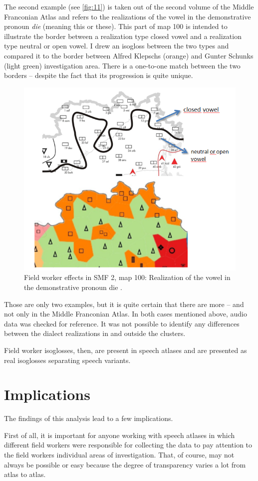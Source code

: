 \documentclass[output=paper]{LSP/langsci}
\begin{document}
The second example (see \ref{fig:11}) is taken out of the second volume of the Middle Franconian Atlas and refers to the realizations of the vowel in the demonstrative pronoun \textit{die} (meaning this or these). This part of map 100 is intended to illustrate the border between a realization type {\textquotedbl}closed vowel{\textquotedbl} and a realization type {\textquotedbl}neutral or open vowel{\textquotedbl}. I drew an isogloss between the two types and compared it to the border between Alfred Klepsch{\textquotesingle}s (orange) and Gunter Schunk{\textquotesingle}s (light green) investigation area. There is a one-to-one match between the two borders – despite the fact that its progression is quite unique.

\begin{figure}
\includegraphics[width=.4\textwidth]{illustrations/mathus_fig12}
\caption{Field worker effects in SMF 2, map 100: Realization of the vowel in the demonstrative pronoun {\textquotedbl}die{\textquotedbl} \citep[241]{mathussek_sprachraume_2014}.}
\label{fig:12}
\end{figure}

Those are only two examples, but it is quite certain that there are more – and not only in the Middle Franconian Atlas. In both cases mentioned above, audio data was checked for reference. It was not possible to identify any differences between the dialect realizations in and outside the clusters.

Field worker isoglosses, then, are present in speech atlases and are presented as {\textquotedbl}real isoglosses{\textquotedbl} separating speech variants.

\section{Implications}
The findings of this analysis lead to a few implications.

First of all, it is important for anyone working with speech atlases in which different field workers were responsible for collecting the data to pay attention to the field workers{\textquotesingle} individual areas of investigation. That, of course, may not always be possible or easy because the degree of transparency varies a lot from atlas to atlas.
\end{document}
